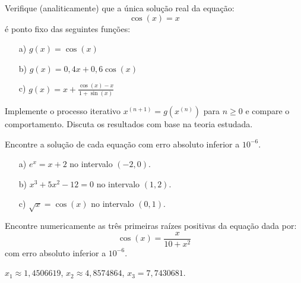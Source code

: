 \begin{exer} Verifique (analiticamente) que a única solução real da equação:
  \begin{equation*}
    \cos(x)=x  
  \end{equation*}
é ponto fixo das seguintes funções:
\begin{itemize}
\item[a)] $g(x)=\cos(x)$
\item[b)] $g(x)=0,4 x+ 0,6\cos(x)$
\item[c)] $g(x)=x+\frac{\cos(x)-x}{1+\sin(x)}$
\end{itemize}
Implemente o processo iterativo $x^{(n+1)}=g(x^{(n)})$ para $n\geq 0$ e compare o comportamento. Discuta os resultados com base na teoria estudada.
\end{exer}


\begin{exer} Encontre a solução de cada equação com erro absoluto inferior a $10^{-6}$.
  \begin{itemize}
  \item[a)] $e^x=x+2$ no intervalo $(-2,0)$.
  \item[b)] $x^3+5x^2-12=0$ no intervalo $(1,2)$.
  \item[c)] $\sqrt{x}=\cos(x)$ no intervalo $(0,1)$.
  \end{itemize}
\end{exer}

\begin{exer} Encontre numericamente as três primeiras raízes positivas da equação dada por:
  \begin{equation*}
    \cos(x)=\frac{x}{10+x^2}  
  \end{equation*}
com erro absoluto inferior a $10^{-6}$.
\end{exer}
\begin{resp}
 $x_1\approx 1,4506619$, $x_2\approx 4,8574864$, $x_3= 7,7430681$. 
\end{resp}



